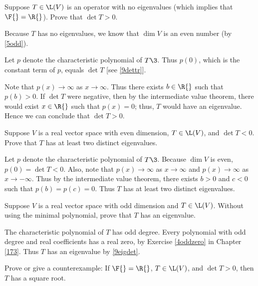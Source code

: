 \exercise
Suppose $T \in \L(V)$ is an operator with no eigenvalues (which implies that $\F{} = \R{}$). Prove that $\det T > 0$.

\begin{Solution}
Because $T$ has no eigenvalues, we know that $\dim V$ is an even number (by \ref{5odd}).

Let $p$ denote the characteristic polynomial of $T\3$. Thus $p(0)$, which is the constant term of $p$, equals $\det T$ [see \ref{9dettr}].

Note that $p(x) \to \infty$ as $x \to \infty$. Thus there exists $b \in \R{}$ such that $p(b) > 0$. If $\det T$ were negative, then by the intermediate value theorem, there would exist $x \in \R{}$ such that $p(x) = 0$; thus, $T$ would have an eigenvalue. Hence we can conclude that $\det T > 0$.
\end{Solution}

\exercise
Suppose $V$ is a real vector space with even dimension, $T \in \L(V)$, and $\det T < 0$. Prove that $T$ has at least two distinct eigenvalues.

\begin{Solution}
Let $p$ denote the characteristic polynomial of $T\3$. Because $\dim V$ is even, $p(0) = \det T < 0$. Also, note that
$p(x) \to \infty$ as $x \to \infty$ and $p(x) \to \infty$ as $x \to -\infty$. Thus by the intermediate value theorem, there exists $b > 0$ and
$c < 0$ such that $p(b) = p(c) = 0$. Thus $T$ has at least two distinct eigenvalues.
\end{Solution}

\exercise
Suppose $V$ is a real vector space with odd dimension and $T \in \L(V)$. Without using the minimal polynomial, prove that $T$ has an eigenvalue.\label{9oddeigen}

\begin{Solution}
The characteristic polynomial of $T$ has odd degree. Every polynomial with odd degree and real coefficients has a real zero, by Exercise \ref{4oddzero} in Chapter \ref{173}. Thus $T$ has an eigenvalue by \ref{9eigdet}.
\end{Solution}

\exercise
Prove or give a counterexample: If $\F{} = \R{}$, $T \in \L(V)$, and $\det T > 0$, then $T$ has a square root.

